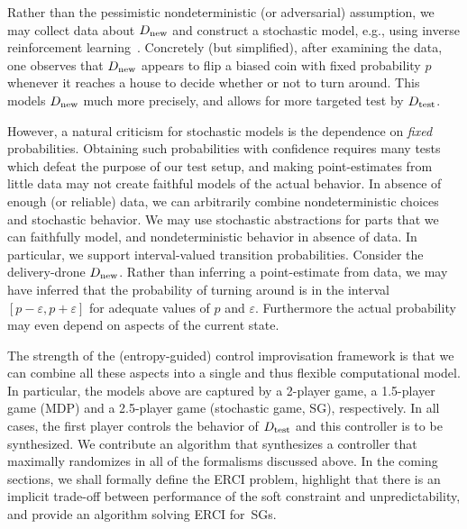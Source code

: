 Rather than the pessimistic nondeterministic (or adversarial)  assumption, we may collect data about ${D_{\text{new}}}$ and construct a stochastic model, e.g., using inverse reinforcement learning~\cite{DBLP:conf/icml/NgR00}.
Concretely (but simplified), after examining the data, one observes that ${D_{\text{new}}}$ appears
to flip a biased coin with fixed probability $p$ whenever it reaches a house to decide whether or
not to turn around. 
This models ${D_{\text{new}}}$ much more precisely, and allows for more targeted test by ${D_{\text{test}}}$.


 However, a natural criticism for stochastic
models is the dependence on \emph{fixed} probabilities. 
Obtaining such probabilities with confidence requires many tests which defeat the purpose of our test setup, and making point-estimates from little data may not create faithful models of the actual behavior.
  In absence of enough (or reliable) data, we can arbitrarily combine
nondeterministic choices and stochastic behavior. We may use stochastic abstractions for parts that we can faithfully model, and nondeterministic behavior in absence of data.
In particular, we
support interval-valued transition probabilities.  Consider the
delivery-drone ${D_{\text{new}}}$. Rather than inferring a point-estimate
from data, we may have inferred that the probability of turning around
is in the interval $[p - \varepsilon, p + \varepsilon]$ for adequate
values of $p$ and $\varepsilon$.  Furthermore the actual probability
may even depend on aspects of the current state.

The strength of the (entropy-guided) control improvisation framework
is that we can combine all these aspects into a single and thus flexible 
computational model. 
In particular, the models above are captured by a 2-player game, a 1.5-player game (MDP) and a 2.5-player game (stochastic game, SG), respectively.
In all cases, the first player controls the behavior of ${D_{\text{test}}}$ and this controller is to be synthesized. 
We contribute an algorithm that synthesizes a controller  that
 maximally randomizes in all of the formalisms discussed above. In the
coming sections, we shall formally define the ERCI problem, highlight
that there is an implicit trade-off between performance of the soft
constraint and unpredictability, and provide an algorithm solving ERCI
for~SGs.

